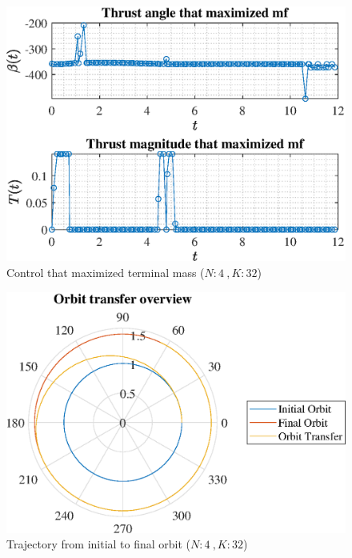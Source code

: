 \documentclass[]{article}
\begin{document}
	\begin{figure}
		\centering
		\includegraphics[scale=0.75]{control_N4_K32_C2_mf.eps}
		\caption{Control that maximized terminal mass (\(N:4\ , K:32\))}
		\label{fig:control_N4_K32_C2_mf}
	\end{figure}
	\begin{figure}
		\centering
		\includegraphics[scale=0.75]{orbit_N4_K32_C2_mf.eps}
		\caption{Trajectory from initial to final orbit (\(N:4\ , K:32\))}
		\label{fig:orbit_N4_K32_C2_mf}
	\end{figure}
\end{document}
